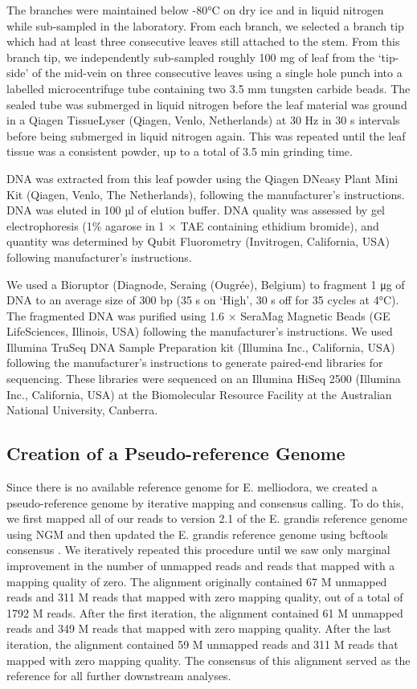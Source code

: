 The branches were maintained below -80°C on dry ice and in liquid nitrogen while sub-sampled in the laboratory. From each branch, we selected a branch tip which had at least three consecutive leaves still attached to the stem. From this branch tip, we independently sub-sampled roughly 100 mg of leaf from the ‘tip-side' of the mid-vein on three consecutive leaves using a single hole punch into a labelled microcentrifuge tube containing two 3.5 mm tungsten carbide beads. The sealed tube was submerged in liquid nitrogen before the leaf material was ground in a Qiagen TissueLyser (Qiagen, Venlo, Netherlands) at 30 Hz in 30 s intervals before being submerged in liquid nitrogen again. This was repeated until the leaf tissue was a consistent powder, up to a total of 3.5 min grinding time.

DNA was extracted from this leaf powder using the Qiagen DNeasy Plant Mini Kit (Qiagen, Venlo, The Netherlands), following the manufacturer's instructions. DNA was eluted in 100 µl of elution buffer. DNA quality was assessed by gel electrophoresis (1\% agarose in 1 × TAE containing ethidium bromide), and quantity was determined by Qubit Fluorometry (Invitrogen, California, USA) following manufacturer's instructions.

We used a Bioruptor (Diagnode, Seraing (Ougrée), Belgium) to fragment 1 μg of DNA to an average size of 300 bp (35 s on ‘High', 30 s off for 35 cycles at 4°C). The fragmented DNA was purified using 1.6 × SeraMag Magnetic Beads (GE LifeSciences, Illinois, USA) following the manufacturer's instructions. We used Illumina TruSeq DNA Sample Preparation kit (Illumina Inc., California, USA) following the manufacturer's instructions to generate paired-end libraries for sequencing. These libraries were sequenced on an Illumina HiSeq 2500 (Illumina Inc., California, USA) at the Biomolecular Resource Facility at the Australian National University, Canberra.

\subsection{Creation of a Pseudo-reference Genome}

Since there is no available reference genome for E. melliodora, we created a pseudo-reference genome by iterative mapping and consensus calling. To do this, we first mapped all of our reads to version 2.1 of the E. grandis reference genome \parencite{bartholome_high-resolution_2015} using NGM \parencite{sedlazeck_nextgenmap_2013} and then updated the E. grandis reference genome using bcftools consensus \parencite{li_statistical_2011}. We iteratively repeated this procedure until we saw only marginal improvement in the number of unmapped reads and reads that mapped with a mapping quality of zero. The alignment originally contained 67 M unmapped reads and 311 M reads that mapped with zero mapping quality, out of a total of 1792 M reads. After the first iteration, the alignment contained 61 M unmapped reads and 349 M reads that mapped with zero mapping quality. After the last iteration, the alignment contained 59 M unmapped reads and 311 M reads that mapped with zero mapping quality. The consensus of this alignment served as the reference for all further downstream analyses.

